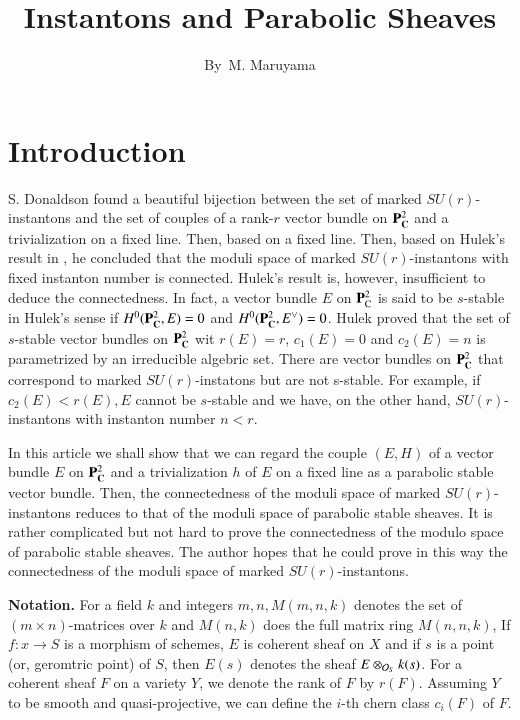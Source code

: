 \title{Instantons and Parabolic Sheaves}

\author{By~M. Maruyama}


\date{}
\maketitle

\section*{Introduction}

S. Donaldson\pageoriginale  \cite{art12-key1} found a beautiful bijection between the set of marked $SU(r)$-instantons and the set of couples of a rank-$r$  vector bundle on $\mathbf{P}_{\mathbf{C}}^{2}$ and a trivialization on a fixed line. Then, based on a fixed line. Then, based on Hulek's result in \cite{art12-key3}, he concluded that the moduli space of marked $SU(r)$-instantons with fixed instanton number is connected. Hulek's result is, however, insufficient to deduce the connectedness. In fact, a vector bundle $E$ on $\mathbf{P}_{\operatorname{C}}^{2}$ is said to be $s$-stable in Hulek's sense if $H^{0}(\mathbf{P}_{\mathbf{C}}^{2}, E) =0$ and $H^{0}(\mathbf{P}_{\mathbf{C}}^{2}, E^{\vee}) =0$. Hulek \cite{art12-key3} proved that the set of $s$-stable vector bundles on $\mathbf{P}_{\mathbf{C}}^{2}$ wit $r(E) =r$, $c_{1}(E)=0$ and $c_{2}(E)=n$ is parametrized by an irreducible algebric set. There are vector bundles on $\mathbf{P}_{\mathbf{C}}^{2}$ that correspond to marked $SU(r)$-instatons but are not s-stable. For example, if $c_{2}(E) < r(E), E$ cannot be $s$-stable and we have, on the other hand, $SU(r)$-instantons with instanton number $n< r$.

In this article we shall show that we can regard the couple $(E,H)$ of  a vector bundle $E$ on $\mathbf{P}_{\mathbf{C}}^{2}$ and a trivialization $h$ of $E$ on a fixed line as a parabolic stable vector bundle. Then, the connectedness of the moduli space of marked $SU(r)$-instantons reduces to that of the moduli space of parabolic stable sheaves. It is rather complicated but not hard to prove the connectedness of the modulo space of parabolic stable sheaves. The author hopes that he could prove in this way the connectedness of the moduli space of marked $SU(r)$-instantons.

\noindent
{\bfseries Notation.} For a field $k$ and integers $m,n, M(m,n,k)$ denotes the set of $(m \times n)$-matrices over $k$ and $M(n,k)$ does the full matrix ring $M(n,n,k)$, If $f : x \rightarrow S$ is a morphism of schemes, $E$ is coherent sheaf on $X$ and if  $s$ is a point (or, geromtric point) of $S$, then $E(s)$ denotes the sheaf $E\otimes_{\mathcal{O}_{S}} k(s)$. For a coherent sheaf $F$ on a variety $Y$, we denote the rank of $F$ by $r(F)$. Assuming $Y$ to be smooth and quasi-projective, we can define the $i$-th chern class $c_{i}(F)$ of $F$.

